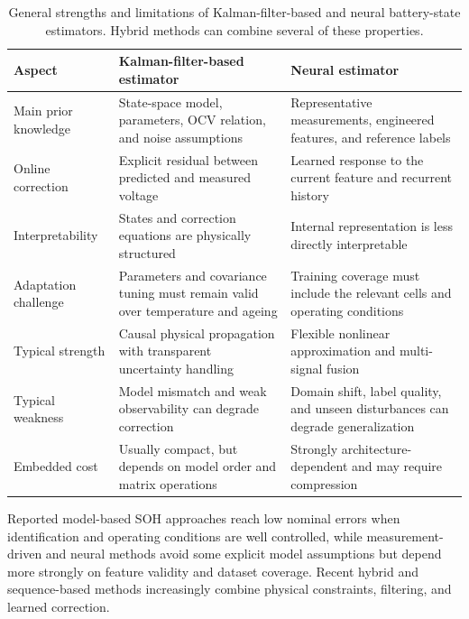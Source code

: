 \documentclass[
    a4paper,
    12pt,
    titlepage,
    bibliography=totoc,
    twoside=on,
    parskip=false,
    numbers=noenddot,
    cleardoublepage=empty,
    DIV=12,
    BCOR=12.0mm,
    headheight=36pt,
    headings=openright
]{scrreprt}
\begin{document}
\begin{table}[htbp]
    \centering
    \small
    \caption[Comparison of Kalman-filter and neural battery-state estimators.]{General strengths and limitations of Kalman-filter-based and neural battery-state estimators. Hybrid methods can combine several of these properties.}
    \label{tab:kalman_ml_comparison}
    \begin{tabularx}{\textwidth}{>{\raggedright\arraybackslash}p{3.1cm}YY}
        \toprule
        Aspect & Kalman-filter-based estimator & Neural estimator \\
        \midrule
        Main prior knowledge & State-space model, parameters, OCV relation, and noise assumptions & Representative measurements, engineered features, and reference labels \\
        Online correction & Explicit residual between predicted and measured voltage & Learned response to the current feature and recurrent history \\
        Interpretability & States and correction equations are physically structured & Internal representation is less directly interpretable \\
        Adaptation challenge & Parameters and covariance tuning must remain valid over temperature and ageing & Training coverage must include the relevant cells and operating conditions \\
        Typical strength & Causal physical propagation with transparent uncertainty handling & Flexible nonlinear approximation and multi-signal fusion \\
        Typical weakness & Model mismatch and weak observability can degrade correction & Domain shift, label quality, and unseen disturbances can degrade generalization \\
        Embedded cost & Usually compact, but depends on model order and matrix operations & Strongly architecture-dependent and may require compression \\
        \bottomrule
    \end{tabularx}
\end{table}

Reported model-based SOH approaches reach low nominal errors when identification and operating conditions are well controlled, while measurement-driven and neural methods avoid some explicit model assumptions but depend more strongly on feature validity and dataset coverage.\autocite{liJointEstimationState2021,biOnlineStateHealth2020,tianFractionalOrderModelBasedIncremental2019,gouStateofHealthEstimationRemainingUsefulLife2020,ojiDataDrivenMethodsBattery2021} Recent hybrid and sequence-based methods increasingly combine physical constraints, filtering, and learned correction.\autocite{gaoCoEstimationStateofChargeStateof2022,shenAlternativeCombinedCoestimation2022,wangFusionEstimationLithiumion2022,xuNovelHybridPhysicsBased2023,pangPhysicsinformedNeuralNetwork2023}
\end{document}
